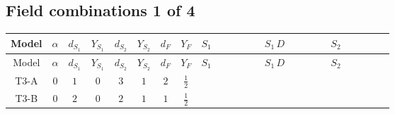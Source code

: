 \documentclass[8pt]{article}
\begin{document}
\begin{landscape}
\subsection*{Field combinations 1 of 4}
\begin{longtable}{@{}cccccccc >{\raggedright\arraybackslash}p{0.21\linewidth} >{\raggedright\arraybackslash}p{0.21\linewidth} >{\raggedright\arraybackslash}p{0.21\linewidth}@{}}
\toprule
Model & $\alpha$ & $d_{S_1}$ & $Y_{S_1}$ & $d_{S_2}$ & $Y_{S_2}$ & $d_F$ & $Y_F$ & $S_1$ & $S_1\,D$ & $S_2$ \\
\midrule
\endfirsthead
\toprule
Model & $\alpha$ & $d_{S_1}$ & $Y_{S_1}$ & $d_{S_2}$ & $Y_{S_2}$ & $d_F$ & $Y_F$ & $S_1$ & $S_1\,D$ & $S_2$ \\
\midrule
\endhead
T3-A & $0$ & $1$ & $0$ & $3$ & $1$ & $2$ & $\frac{1}{2}$ & \scriptsize\adjustbox{max width=\linewidth}{$\begin{gathered} -S_1 S_1{}^{\dagger } m_1^2 \\ +\frac{1}{2} S_1^2 \left(S_1{}^{\dagger }\right){}^2 \lambda_{S_1}^{(1)}^{(1)}\end{gathered}$} & \scriptsize\adjustbox{max width=\linewidth}{$\begin{gathered} +D_{\mu _1}\left(S_1\right){}^{\dagger } D_{\mu _1}\left(S_1\right)\end{gathered}$} & \scriptsize\adjustbox{max width=\linewidth}{$\begin{gathered} -m_2^2 S_{2,j_1} S_{2,j_1}{}^{\dagger } \\ +\frac{1}{2} S_{2,j_3} S_{2,j_4} S_{2,j_1}{}^{\dagger } S_{2,j_2}{}^{\dagger } \mathcal{I}_{S_2,j_1,j_3,j_2,j_4}{}^1 \lambda_{S_2}^{(1)}^{(1)} \\ +\frac{1}{2} S_{2,j_3} S_{2,j_4} S_{2,j_1}{}^{\dagger } S_{2,j_2}{}^{\dagger } \mathcal{I}_{S_2,j_1,j_3,j_2,j_4}{}^2 \lambda_{S_2}^{(1)}^{(2)}\end{gathered}$} \\
\midrule
T3-B & $0$ & $2$ & $0$ & $2$ & $1$ & $1$ & $\frac{1}{2}$ & \scriptsize\adjustbox{max width=\linewidth}{$\begin{gathered} -S_{1,j_1} S_{1,j_1}{}^{\dagger } m_1^2 \\ +\frac{1}{2} S_{1,j_3} S_{1,j_4} S_{1,j_1}{}^{\dagger } S_{1,j_2}{}^{\dagger } \mathcal{I}_{S_1,j_1,j_3,j_2,j_4}{}^1 \lambda_{S_1}^{(1)}^{(1)}\end{gathered}$} & \scriptsize\adjustbox{max width=\linewidth}{$\begin{gathered} +D_{\mu _1}\left(S_{1,j_1}\right){}^{\dagger } D_{\mu _1}\left(S_{1,j_1}\right)\end{gathered}$} & \scriptsize\adjustbox{max width=\linewidth}{$\begin{gathered} -m_2^2 S_{2,j_1} S_{2,j_1}{}^{\dagger } \\ +\frac{1}{2} S_{2,j_3} S_{2,j_4} S_{2,j_1}{}^{\dagger } S_{2,j_2}{}^{\dagger } \mathcal{I}_{S_2,j_1,j_3,j_2,j_4}{}^1 \lambda_{S_2}^{(1)}^{(1)}\end{gathered}$} \\

\end{longtable}
\end{landscape}
\end{document}
